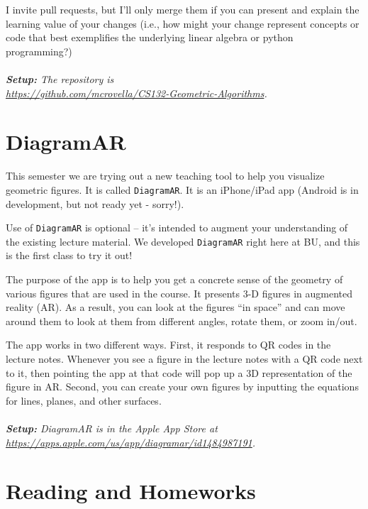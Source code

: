 \documentclass[11pt]{article}
\begin{document}
I invite pull requests, but I'll only merge them
if you can present and explain the learning value of your changes (i.e.,
how might your change represent concepts or code that best
exemplifies the underlying linear algebra or python
programming?) 
\\
~\\\emph{\textbf{Setup:} The
repository is \\
\url{https://github.com/mcrovella/CS132-Geometric-Algorithms}.}

\section*{DiagramAR} 

This semester we are trying out a new teaching tool to help you
visualize geometric figures.   It is called \texttt{DiagramAR}.  It is
an iPhone/iPad app (Android is in development, but not ready yet - sorry!).

Use of \texttt{DiagramAR} is optional -- it's intended to augment your
understanding of the existing lecture material.    We developed
\texttt{DiagramAR} right here at BU, and this is the first class to try it out!

The purpose of the app is to help you get a concrete sense of the
geometry of various figures that are used in the course.    It presents
3-D figures in augmented reality (AR).   As a result, you can look at the
figures ``in space'' and can move around them to look at them from
different angles, rotate them, or zoom in/out.

The app works in two different ways.    First, it responds to QR codes
in the lecture notes.   Whenever you see a figure in the lecture notes
with a QR code next to it, then pointing the app at that code will pop
up a 3D representation of the figure in AR.    Second, you can create
your own figures by inputting the equations for lines, planes, and other
surfaces.
\\
~\\\emph{\textbf{Setup:} 
DiagramAR is in the Apple App Store at \\
\url{https://apps.apple.com/us/app/diagramar/id1484987191}. }

\newpage
\section*{Reading and Homeworks}
\end{document}
